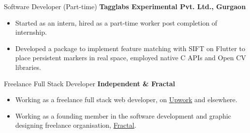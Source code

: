{Software Developer (Part-time)}
{\textbf{Tagglabs Experimental Pvt. Ltd., Gurgaon}}
{
\begin{itemize}
\item Started as an intern, hired as a part-time worker post completion of internship.
    \item Developed a package to implement feature
matching with SIFT on Flutter to place persistent
markers in real space, employed native C
APIs and Open CV libraries.
\end{itemize}
}
%
%
{Freelance Full Stack Developer}
{\textbf{Independent \& Fractal}}
{
\begin{itemize}
\item Working as a freelance full stack web developer,
on \href{https://www.upwork.com/freelancers/~015388e15d840b96cb}{Upwork} and elsewhere.
\item Working as a founding member in the software
development and graphic designing freelance
organisation, \href{https://fractalweb.netlify.app/}{Fractal}.
\end{itemize}
}
%
%